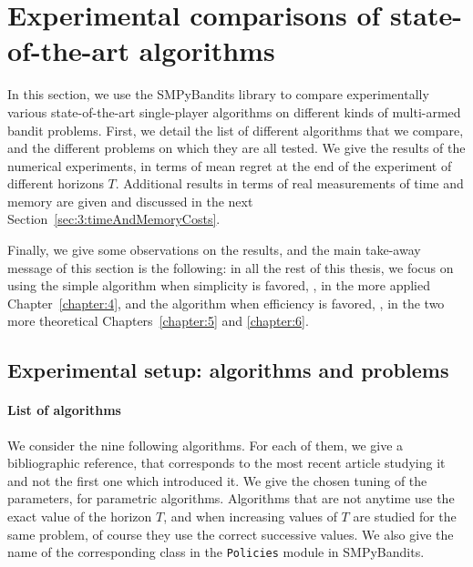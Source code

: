 \section{Experimental comparisons of state-of-the-art algorithms}
\label{sec:3:reviewSPAlgorithms}


In this section, we use the SMPyBandits library to compare experimentally various state-of-the-art single-player algorithms on different kinds of multi-armed bandit problems.
First, we detail the list of different algorithms that we compare, and the different problems on which they are all tested.
We give the results of the numerical experiments, in terms of mean regret at the end of the experiment of different horizons $T$.
Additional results in terms of real measurements of time and memory are given and discussed in the next Section~\ref{sec:3:timeAndMemoryCosts}.

Finally, we give some observations on the results, and the main take-away message of this section is the following: in all the rest of this thesis, we focus on using the simple \UCB{} algorithm when simplicity is favored, \ie, in the more applied Chapter~\ref{chapter:4}, and the \klUCB{} algorithm when efficiency is favored, \ie, in the two more theoretical Chapters~\ref{chapter:5} and \ref{chapter:6}.


\subsection{Experimental setup: algorithms and problems}

\paragraph{List of algorithms}

We consider the nine following algorithms. For each of them, we give a bibliographic reference, that corresponds to the most recent article studying it and not the first one which introduced it.
We give the chosen tuning of the parameters, for parametric algorithms.
Algorithms that are not anytime use the exact value of the horizon $T$, and when increasing values of $T$ are studied for the same problem, of course they use the correct successive values.
We also give the name of the corresponding class in the \texttt{Policies} module in SMPyBandits.

